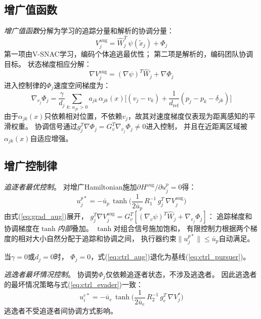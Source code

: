 \documentclass[conference]{IEEEtran}
\begin{document}
\subsection{增广值函数}

\emph{增广值函数}分解为学习的追踪分量和解析的协调分量：
\begin{equation}\label{eq:vaug}
V_j^{\mathrm{aug}} = \hat{W}_j^T\,\psi(\tilde{x}_j) + \Phi_j
\end{equation}
第一项由V-SNAC学习，编码个体追逃最优性；
第二项是解析的，编码团队协调目标。
状态梯度相应分解：
\begin{equation}\label{eq:grad_aug}
\nabla V_j^{\mathrm{aug}} = (\nabla \psi)^T \hat{W}_j + \nabla \Phi_j
\end{equation}
进入控制律的$\Phi_j$速度空间梯度为：
\begin{equation}\label{eq:grad_phi}
\nabla_{v_j}\!\Phi_j = \frac{\gamma}{d_j}\!\sum_{k:\,a_{jk}>0}\! a_{jk}\,\alpha_{jk}(x)
\bigg[(v_j{-}v_k) + \frac{1}{d_{\mathrm{ref}}}(p_j{-}p_k{-}\delta_{jk})\bigg]
\end{equation}
由于$\alpha_{jk}(x)$只依赖相对位置，不依赖$v_j$，故其对速度梯度仅表现为距离感知的平滑权重。
协调信号通过$g_j^T\nabla\Phi_j = G_v^T\nabla_{v_j}\Phi_j \neq 0$进入控制，
并且在近距离区域被$\alpha_{jk}(x)$自适应增强。

\subsection{增广控制律}

\textit{追逐者最优控制}。
对增广Hamiltonian施加$\partial H^{\mathrm{aug}}/\partial u_j^p = 0$得：
\begin{equation}\label{eq:ctrl_aug}
u_j^{p*} = -\bar{u}_p\,\tanh\!\bigg(\frac{1}{2\bar{u}_p}\,R_1^{-1}\,g_j^T\,\nabla V_j^{\mathrm{aug}}\bigg)
\end{equation}
由式(\ref{eq:grad_aug})展开，
$g_j^T \nabla V_j^{\mathrm{aug}} = G_v^T[(\nabla_v \psi)^T \hat{W}_j + \nabla_{v_j}\Phi_j]$：
追踪梯度和协调梯度在$\tanh$\emph{内部}叠加。
$\tanh$对组合信号施加饱和，
有限控制力根据两个梯度的相对大小自然分配于追踪和协调之间，
执行器约束$\|u_j^{p*}\| \leq \bar{u}_p$自动满足。

当$\gamma = 0$或$d_j = 0$时，
$\Phi_j = 0$，式(\ref{eq:ctrl_aug})退化为基线(\ref{eq:ctrl_pursuer})。

\textit{逃逸者最坏情况控制}。
协调势$\Phi_j$仅依赖追逐者状态，不涉及逃逸者。
因此逃逸者的最坏情况策略与式(\ref{eq:ctrl_evader})一致：
\begin{equation}\label{eq:ctrl_evader_aug}
u_i^{e*} = -\bar{u}_e\,\tanh\!\bigg(\frac{1}{2\bar{u}_e}\,R_2^{-1}\,g_e^T\,\nabla V_j^*\bigg)
\end{equation}
逃逸者不受追逐者间协调方式影响。
\end{document}
